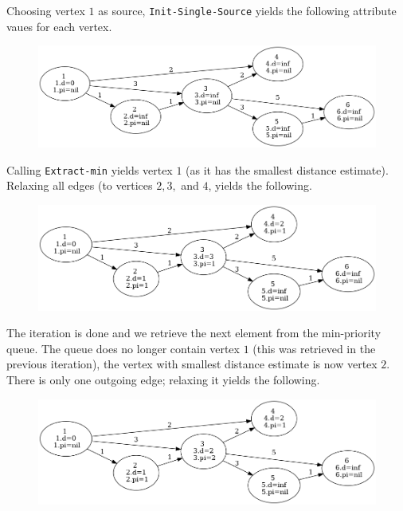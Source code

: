 Choosing vertex $1$ as source, \verb|Init-Single-Source| yields the following attribute vaues for each vertex.

\begin{figure}[H]
\centering
\includegraphics[scale=0.4]{images/dijkstra_2.png}
\end{figure}

Calling \verb|Extract-min| yields vertex $1$ (as it has the smallest distance estimate). Relaxing all edges (to vertices $2,3,$ and $4$, yields the following.

\begin{figure}[H]
\centering
\includegraphics[scale=0.4]{images/dijkstra_3.png}
\end{figure}

The iteration is done and we retrieve the next element from the min-priority queue. The queue does no longer contain vertex $1$ (this was retrieved in the previous iteration), the vertex with smallest distance estimate is now vertex $2$. There is only one outgoing edge; relaxing it yields the following.

\begin{figure}[H]
\centering
\includegraphics[scale=0.4]{images/dijkstra_4.png}
\end{figure}

